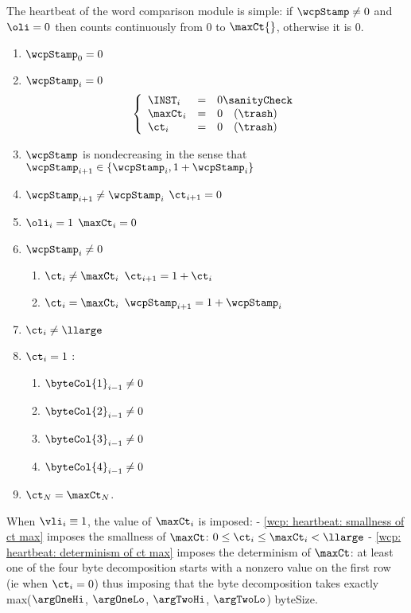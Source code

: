 The heartbeat of the word comparison module is simple: if $\wcpStamp \neq 0$ and $\oli = 0$ then \ct{} counts continuously from $0$ to $\maxCt{}$, otherwise it is $0$.
\begin{enumerate}
	\item $\wcpStamp_{0} = 0$
	\item \If $\wcpStamp_{i} = 0$ \Then
		\[
			\left\{ \begin{array}{lcl}
				\INST_{i}  & = & 0 \sanityCheck   \\
				\maxCt_{i} & = & 0 \quad (\trash) \\
				\ct_{i}    & = & 0 \quad (\trash) \\
			\end{array} \right.
		\]
	\item $\wcpStamp$ is nondecreasing in the sense that $\wcpStamp_{i + 1} \in \{ \wcpStamp_{i}, 1 + \wcpStamp_{i} \}$
	\item \If $\wcpStamp_{i + 1} \neq \wcpStamp_{i}$ \Then $\ct_{i + 1} = 0$
	\item \If $\oli_{i} = 1$ \Then $\maxCt_{i}=0$
	\item \If $\wcpStamp_{i} \neq 0$ \Then
		\begin{enumerate}
			\item \If $\ct_{i} \neq \maxCt_{i}$ \Then $\ct_{i + 1} = 1 + \ct_{i}$
			\item \If $\ct_{i} =    \maxCt_{i}$ \Then $\wcpStamp_{i + 1} = 1 + \wcpStamp_{i}$
		\end{enumerate}
	\label{wcp: heartbeat: smallness of ct max}
	\item $\ct_{i} \neq \llarge$
	\label{wcp: heartbeat: determinism of ct max}
	\item \If $\ct_{i} = 1 $ \Then: 
	\begin{enumerate}
			\item \Or $\byteCol{1}_{i-1} \neq 0$
			\item \Or $\byteCol{2}_{i-1} \neq 0$
			\item \Or $\byteCol{3}_{i-1} \neq 0$
			\item \Or $\byteCol{4}_{i-1} \neq 0$
	\end{enumerate}	
	\item $\ct_{N} = \maxCt_{N}$.
\end{enumerate}
\saNote{} When $\vli_i \equiv 1$, the value of $\maxCt_i$ is imposed:
- \ref{wcp: heartbeat: smallness of ct max} imposes the smallness of $\maxCt$: $0 \leq \ct_{i} \leq \maxCt_{i} < \llarge$
- \ref{wcp: heartbeat: determinism of ct max} imposes the determinism of $\maxCt$: at least one of the four byte decomposition starts with a nonzero value on the first row (ie when $\ct_{i} = 0$) thus imposing that the byte decomposition takes exactly max($\argOneHi$, $\argOneLo$, $\argTwoHi$, $\argTwoLo$) byteSize. 

